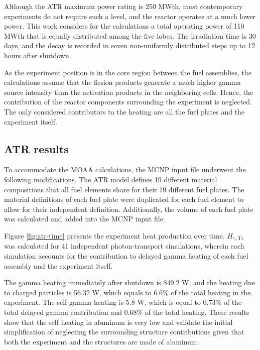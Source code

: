 \documentclass{style/nseJournal}
\begin{document}
Although the ATR maximum power rating is 250 MWth, most contemporary experiments do not require such a level, and the reactor operates at a much lower power.
This work considers for the calculations a total operating power of 110 MWth that is equally distributed among the five lobes.
The irradiation time is 30 days, and the decay is recorded in seven non-uniformly distributed steps up to 12 hours after shutdown.

As the experiment position is in the core region between the fuel assemblies, the calculations assume that the fission products generate a much higher gamma source intensity than the activation products in the neighboring cells.
Hence, the contribution of the reactor components surrounding the experiment is neglected.
The only considered contributors to the heating are all the fuel plates and the experiment itself.


\subsection{ATR results}

To accommodate the MOAA calculations, the MCNP input file underwent the following modifications.
The ATR model defines 19 different material compositions that all fuel elements share for their 19 different fuel plates.
The material definitions of each fuel plate were duplicated for each fuel element to allow for their independent definition.
Additionally, the volume of each fuel plate was calculated and added into the MCNP input file.

Figure \ref{fig:atr-time} presents the experiment heat production over time.
$H_{\mathrm{\gamma, Tr}}$ was calculated for 41 independent photon-transport simulations, wherein each simulation accounts for the contribution to delayed gamma heating of each fuel assembly and the experiment itself.

The gamma heating immediately after shutdown is 849.2 W, and the heating due to charged particles is 56.32 W, which equals to 6.6\% of the total heating in the experiment.
The self-gamma heating is 5.8 W, which is equal to 0.73\% of the total delayed gamma contribution and 0.68\% of the total heating.
These results show that the self heating in aluminum is very low and validate the initial simplification of neglecting the surrounding structure contributions given that both the experiment and the structures are made of aluminum.
\end{document}
